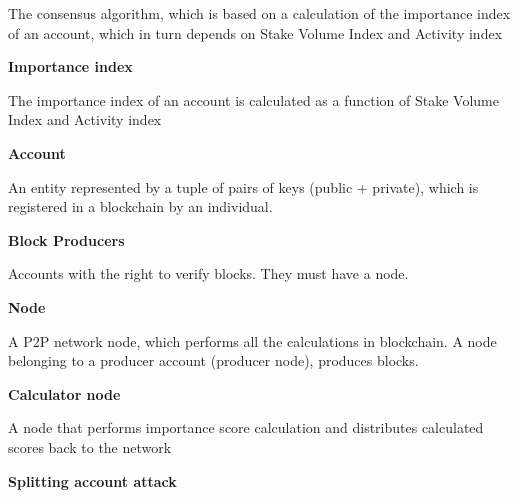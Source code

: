 \documentclass[a4paper,12pt]{article}
\begin{document}
The consensus algorithm, which is based on a calculation of the importance index of an account, which in turn depends on Stake Volume Index and Activity index

\textbf{Importance index}

The importance index of an account is calculated as a function of Stake Volume Index and Activity index

\textbf{Account}

An entity represented by a tuple of pairs of keys (public + private), which is registered in a blockchain by an individual.

\textbf{Block Producers}

Accounts with the right to verify blocks. They must have a node.

\textbf{Node}

A P2P network node, which performs all the calculations in blockchain. A node belonging to a producer account (producer node), produces blocks.

\textbf{Calculator node} 

A node that performs importance score calculation and distributes calculated scores back to the network

\textbf{Splitting account attack} 
\end{document}
